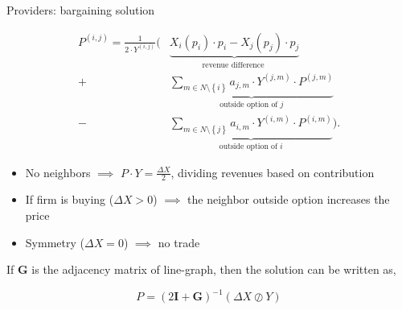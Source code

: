 \documentclass[xcolor={svgnames}]{beamer}
\newcommand{\matr}[1]{\bm{#1}}
\newcommand{\set}[1]{\left\{#1\right\}}
\begin{document}
    \begin{frame}[allowframebreaks]{Providers: bargaining solution}



        \begin{equation*}
            \begin{split}
                P^{(i, j)} = \frac{1}{2\cdot Y^{(i, j)}} \Biggl( &\underbrace{X_i(p_i)\cdot p_i - X_j(p_j)\cdot p_j}_{\text{revenue difference }}
                \\  + &\underbrace{\sum_{m\in N\setminus \set{i}} a_{j, m} \cdot Y^{(j, m)} \cdot P^{(j, m)}}_{\text{outside option of } j}
                \\ - & \underbrace{\sum_{m \in N\setminus \set{j}} a_{i, m} \cdot Y^{(i, m)} \cdot P^{(i, m)}}_{\text{outside option of } i} \Biggr).
            \end{split}
        \end{equation*}

        \newpage

        \begin{itemize}\setlength\itemsep{1.5em}
            \item No neighbors $\implies$ $P \cdot Y = \frac{\Delta X}{2}$, dividing revenues based on contribution
            \item If firm is buying ($\Delta X > 0$) $\implies$  the neighbor outside option increases the price
            \item Symmetry ($\Delta X = 0$) $\implies$ no trade
        \end{itemize}

        If $\matr{G}$ is the adjacency matrix of line-graph, then the solution can be written as,

        \begin{equation*}
            P = (2\matr{I} + \matr{G})^{-1} (\Delta X \oslash Y)
        \end{equation*}

    \end{frame}
\fi

\iffalse
    \begin{frame}[allowframebreaks]{Bibliography}
        \nocite{*}
        \printbibliography
    \end{frame}
\fi
\end{document}
